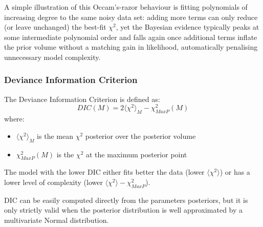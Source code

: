 A simple illustration of this Occam's-razor behaviour is fitting polynomials of increasing degree to the same noisy data set: adding more terms can only reduce (or leave unchanged) the best-fit $\chi^2$, yet the Bayesian evidence typically peaks at some intermediate polynomial order and falls again once additional terms inflate the prior volume without a matching gain in likelihood, automatically penalising unnecessary model complexity.

\subsubsection{Deviance Information Criterion}

The Deviance Information Criterion is defined as:
$$
DIC(M) = 2 \langle \chi^2 \rangle_M - \chi^2_{MaxP}(M)
$$
where:
\begin{itemize}
    \item $\langle \chi^2 \rangle_M$ is the mean $\chi^2$ posterior over the posterior volume
    \item $\chi^2_{MaxP}(M)$ is the $\chi^2$ at the maximum posterior point
\end{itemize}

The model with the lower DIC either fits better the data (lower $\langle \chi^2\rangle$) or has a lower level of complexity (lower $\langle \chi^2\rangle - \chi^2_{MaxP}$).

DIC can be easily computed directly from the parameters posteriors, but it is only strictly valid when the posterior distribution is well approximated by a multivariate Normal distribution.

